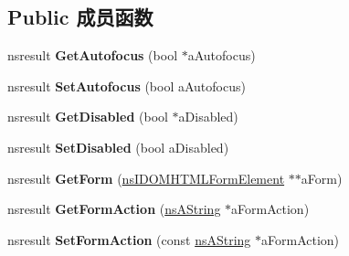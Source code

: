 \subsection*{Public 成员函数}
\begin{DoxyCompactItemize}
\item 
\mbox{\label{interfacens_i_d_o_m_h_t_m_l_button_element_a860293d95f3d2e9ff7905ef833b8f3b0}} 
nsresult {\bfseries Get\+Autofocus} (bool $\ast$a\+Autofocus)
\item 
\mbox{\label{interfacens_i_d_o_m_h_t_m_l_button_element_a6a5b28d8b4de00249807a189785c15f0}} 
nsresult {\bfseries Set\+Autofocus} (bool a\+Autofocus)
\item 
\mbox{\label{interfacens_i_d_o_m_h_t_m_l_button_element_a65369924dce6df00f9bb107dbda354d6}} 
nsresult {\bfseries Get\+Disabled} (bool $\ast$a\+Disabled)
\item 
\mbox{\label{interfacens_i_d_o_m_h_t_m_l_button_element_aa3e3cbcac1a1a1ceb71f0e88cd8b32af}} 
nsresult {\bfseries Set\+Disabled} (bool a\+Disabled)
\item 
\mbox{\label{interfacens_i_d_o_m_h_t_m_l_button_element_a9c13ae80630e16694361175ab4434565}} 
nsresult {\bfseries Get\+Form} (\hyperlink{interfacens_i_d_o_m_h_t_m_l_form_element}{ns\+I\+D\+O\+M\+H\+T\+M\+L\+Form\+Element} $\ast$$\ast$a\+Form)
\item 
\mbox{\label{interfacens_i_d_o_m_h_t_m_l_button_element_a57f6506ba2d52c1743d348c312dfe839}} 
nsresult {\bfseries Get\+Form\+Action} (\hyperlink{structns_string_container}{ns\+A\+String} $\ast$a\+Form\+Action)
\item 
\mbox{\label{interfacens_i_d_o_m_h_t_m_l_button_element_a78a4113998f48eacf4c6167ea6654839}} 
nsresult {\bfseries Set\+Form\+Action} (const \hyperlink{structns_string_container}{ns\+A\+String} $\ast$a\+Form\+Action)
\item 
\mbox{\label{interfacens_i_d_o_m_h_t_m_l_button_element_a8c90592cca801fda3fa1d05dc8f89d83}} 
$$
\end{DoxyCompactItemize}
